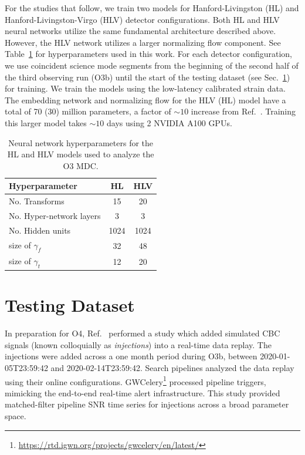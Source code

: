 \begin{refsection}
For the studies that follow, we train two \amplfi models for Hanford-Livingston (HL) and Hanford-Livingston-Virgo (HLV) detector configurations. 
Both HL and HLV neural networks utilize the same fundamental architecture described above. 
However, the HLV network utilizes a larger normalizing flow component. 
See Table~\ref{amp_res_tab:hps} for hyperparameters used in this work. 
For each detector configuration, we use coincident science mode segments from the beginning of the second half of the third observing run (O3b) until the start of the testing dataset (see Sec.~\ref{amp_res_sec:testing-data}) for training. 
We train the models using the low-latency calibrated strain data. 
The embedding network and normalizing flow for the HLV (HL) model have a total of 70 (30) million parameters, a factor of $\sim 10$ increase from Ref.~\cite{Chatterjee:2024pbj}. 
Training this larger model takes $\sim 10$ days using 2 NVIDIA A100 GPUs.

\begin{table}[ht]
    \centering
    \begin{tabular}{lcc} 
    \hline
    Hyperparameter & HL & HLV \\
    \hline\hline
    No. Transforms & 15 & 20 \\
    \hline
    No. Hyper-network layers & 3 & 3 \\
    \hline
    No. Hidden units & 1024 & 1024 \\
    \hline
    size of $\gamma_f$  & 32 & 48 \\
    \hline
    size of $\gamma_t$ & 12 & 20 \\
    \hline
    \end{tabular}
    \caption[Neural network hyperparameters for the HL and HLV models used to analyze the O3 MDC]{Neural network hyperparameters for the HL and HLV models used to analyze the O3 MDC.}
    \label{amp_res_tab:hps}
\end{table}


\section{Testing Dataset} \label{amp_res_sec:testing-data}
In preparation for O4, Ref.~\cite{Chaudhary_2024} performed a study which added simulated CBC signals (known colloquially as \emph{injections}) into a real-time data replay. 
The injections were added across a one month period during O3b, between 2020-01-05T23:59:42 and 2020-02-14T23:59:42. 
Search pipelines analyzed the data replay using their online configurations. GWCelery\footnote{\url{https://rtd.igwn.org/projects/gwcelery/en/latest/}} processed pipeline triggers, mimicking the end-to-end real-time alert infrastructure. 
This study provided matched-filter pipeline SNR time series for injections across a broad parameter space. 


\end{refsection}
